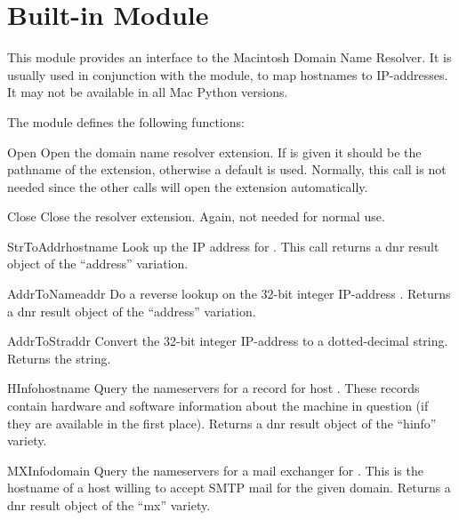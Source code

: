 \section{Built-in Module }
\label{module-macdnr}

This module provides an interface to the Macintosh Domain Name
Resolver.  It is usually used in conjunction with the 
module, to map hostnames to IP-addresses.  It may not be available in
all Mac Python versions.

The  module defines the following functions:


\begin{funcdesc}{Open}{}
Open the domain name resolver extension.  If  is given it
should be the pathname of the extension, otherwise a default is
used.  Normally, this call is not needed since the other calls will
open the extension automatically.
\end{funcdesc}

\begin{funcdesc}{Close}{}
Close the resolver extension.  Again, not needed for normal use.
\end{funcdesc}

\begin{funcdesc}{StrToAddr}{hostname}
Look up the IP address for .  This call returns a dnr
result object of the ``address'' variation.
\end{funcdesc}

\begin{funcdesc}{AddrToName}{addr}
Do a reverse lookup on the 32-bit integer IP-address
.  Returns a dnr result object of the ``address'' variation.
\end{funcdesc}

\begin{funcdesc}{AddrToStr}{addr}
Convert the 32-bit integer IP-address  to a dotted-decimal
string.  Returns the string.
\end{funcdesc}

\begin{funcdesc}{HInfo}{hostname}
Query the nameservers for a  record for host
.  These records contain hardware and software
information about the machine in question (if they are available in
the first place).  Returns a dnr result object of the ``hinfo''
variety.
\end{funcdesc}

\begin{funcdesc}{MXInfo}{domain}
Query the nameservers for a mail exchanger for .  This is
the hostname of a host willing to accept SMTP mail for the given
domain.  Returns a dnr result object of the ``mx'' variety.
\end{funcdesc}

